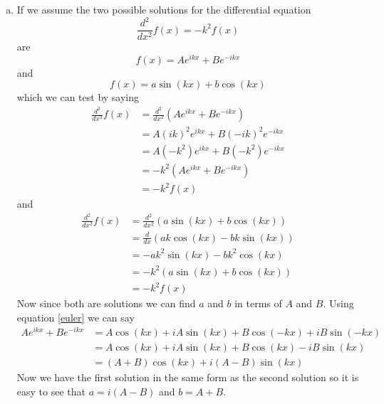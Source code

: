 \documentclass[11pt]{article}
\numberwithin{equation}{section}
\begin{document}
\begin{enumerate}[(a)]
\item
If we assume the two possible solutions for the differential equation 
$$\frac{d^2}{dx^2}f(x) = -k^2f(x)$$
are
$$f(x) = Ae^{ikx}+Be^{-ikx}$$
and
$$f(x) = a\sin(kx) + b\cos(kx)$$
which we can test by saying
\begin{align*}
\frac{d^2}{dx^2}f(x) &= \frac{d^2}{dx^2}\left(Ae^{ikx}+Be^{-ikx}\right)\\
&= A(ik)^2e^{ikx}+B(-ik)^2e^{-ikx}\\
&= A(-k^2)e^{ikx}+B(-k^2)e^{-ikx}\\
&= -k^2(Ae^{ikx}+Be^{-ikx})\\
&= -k^2f(x)
\end{align*}
and
\begin{align*}
\frac{d^2}{dx^2}f(x) &= \frac{d^2}{dx^2}\left(a\sin(kx) + b\cos(kx)\right)\\
&= \frac{d}{dx}\left(ak\cos(kx) - bk\sin(kx)\right)\\
&= -ak^2\sin(kx) - bk^2\cos(kx)\\
&= -k^2(a\sin(kx) + b\cos(kx))\\
&= -k^2f(x)
\end{align*}
Now since both are solutions we can find $a$ and $b$ in terms of $A$ and $B$. Using equation \ref{euler} we can say
\begin{align*}
Ae^{ikx}+Be^{-ikx} &= A\cos(kx)+iA\sin(kx)+B\cos(-kx)+iB\sin(-kx)\\
&= A\cos(kx)+iA\sin(kx)+B\cos(kx)-iB\sin(kx)\\
&= (A+B)\cos(kx)+i(A-B)\sin(kx)
\end{align*}
Now we have the first solution in the same form as the second solution so it is easy to see that $a = i(A-B)$ and $b = A+B$.
\end{enumerate}
\end{document}
